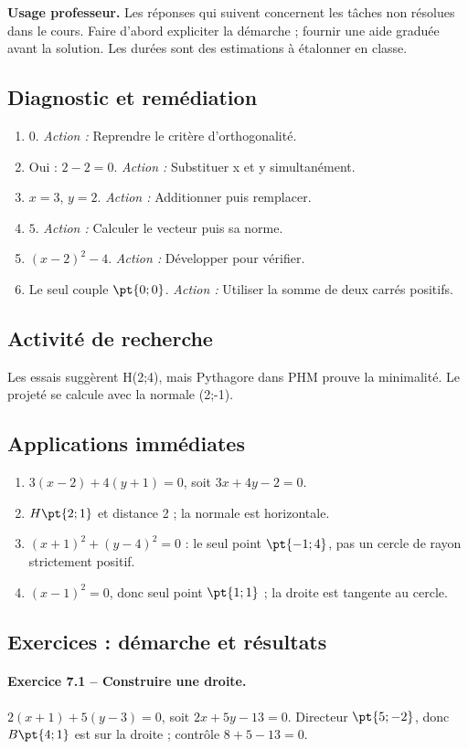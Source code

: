 \label{C07-CORR}
\textbf{Usage professeur.} Les réponses qui suivent concernent les tâches non résolues dans le cours. Faire d’abord expliciter la démarche ; fournir une aide graduée avant la solution. Les durées sont des estimations à étalonner en classe.
\subsection*{Diagnostic et remédiation}
\begin{enumerate}
\item $0$. \textit{Action :} Reprendre le critère d’orthogonalité.
\item Oui : $2-2=0$. \textit{Action :} Substituer x et y simultanément.
\item $x=3$, $y=2$. \textit{Action :} Additionner puis remplacer.
\item $5$. \textit{Action :} Calculer le vecteur puis sa norme.
\item $(x-2)^2-4$. \textit{Action :} Développer pour vérifier.
\item Le seul couple $\pt{0;0}$. \textit{Action :} Utiliser la somme de deux carrés positifs.
\end{enumerate}
\subsection*{Activité de recherche}
Les essais suggèrent H(2;4), mais Pythagore dans PHM prouve la minimalité. Le projeté se calcule avec la normale (2;-1).
\subsection*{Applications immédiates}
\begin{enumerate}
\item $3(x-2)+4(y+1)=0$, soit $3x+4y-2=0$.
\item $H\pt{2;1}$ et distance 2 ; la normale est horizontale.
\item $(x+1)^2+(y-4)^2=0$ : le seul point $\pt{-1;4}$, pas un cercle de rayon strictement positif.
\item $(x-1)^2=0$, donc seul point $\pt{1;1}$ ; la droite est tangente au cercle.
\end{enumerate}
\subsection*{Exercices : démarche et résultats}
\paragraph{Exercice 7.1 -- Construire une droite.} $2(x+1)+5(y-3)=0$, soit $2x+5y-13=0$. Directeur $\pt{5;-2}$, donc $B\pt{4;1}$ est sur la droite ; contrôle $8+5-13=0$.
